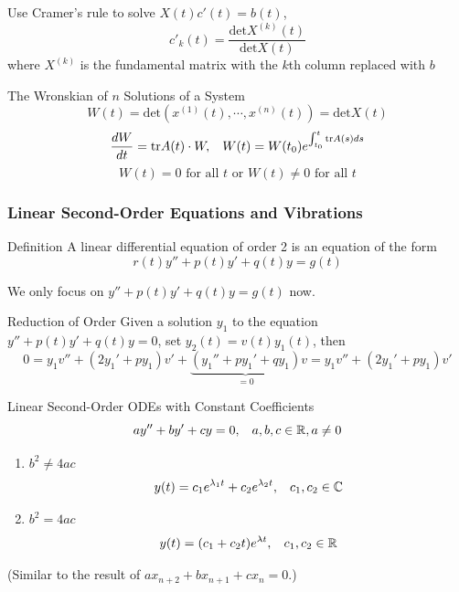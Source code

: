 \documentclass{beamer}
\begin{document}
\begin{frame}
\begin{block}{}
Use Cramer's rule to solve $X(t)c'(t)=b(t)$,
$$c'_k(t)=\dfrac{\text{det}X^{(k)}(t)}{\text{det}X(t)} $$
where $X^{(k)}$ is the fundamental matrix with the $k$th column replaced with $b$
\end{block}

\begin{block}{The Wronskian of $n$ Solutions of a System}
$$W(t)=\text{det}(x^{(1)}(t),\cdots,x^{(n)}(t))=\text{det}X(t)$$
$$\dfrac{dW}{dt}=\text{tr}A(t)\cdot W,\hspace{3mm} W(t)=W(t_0)e^{\int_{t_0}^t\text{tr}A(s)ds}$$
$$W(t)=0\text{ for all }t\text{ or }W(t)\neq0\text{ for all }t$$
\end{block}
\end{frame}

\begin{frame}
\frametitle{Linear Second-Order Equations and Vibrations}
\begin{block}{Definition}
A linear differential equation of order 2 is an equation of the form
$$r(t)y''+p(t)y'+q(t)y=g(t)$$
\end{block}
We only focus on $y''+p(t)y'+q(t)y=g(t)$ now.
\end{frame}

\begin{frame}
\begin{block}{Reduction of Order}
Given a solution $y_1$ to the equation $y''+p(t)y'+q(t)y=0$, set $y_2(t)=v(t)y_1(t)$, then
$$0=y_1v''+(2y_1'+py_1)v'+\underbrace{(y_1''+py_1'+qy_1)}_{=0}v=y_1v''+(2y_1'+py_1)v'$$
\end{block}
\end{frame}

\begin{frame}
\begin{block}{Linear Second-Order ODEs with Constant Coefficients}
$$ay''+by'+cy=0,\hspace{3mm}a,b,c\in\mathbb{R},a\neq0$$
\begin{enumerate}
\item $b^2\neq4ac$
$$y(t)=c_1e^{\lambda_1t}+c_2e^{\lambda_2t},\hspace{3mm}c_1,c_2\in\mathbb{C}$$
\item $b^2=4ac$
$$y(t)=(c_1+c_2t)e^{\lambda t},\hspace{3mm}c_1,c_2\in\mathbb{R}$$
\end{enumerate}
(Similar to the result of $ax_{n+2}+bx_{n+1}+cx_n=0$.)
\end{block}
\end{frame}
\end{document}
